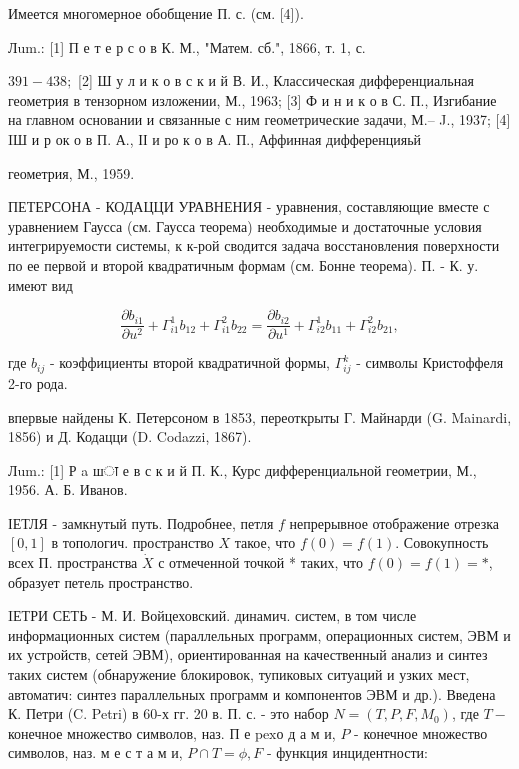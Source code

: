 \documentclass[10pt]{article}
\begin{document}
Имеется многомерное обобщение П. с. (см. [4]).



Лum.: [1] П е т е р с о в К. М., "Матем. сб.", 1866, т. 1, с.

$391-438 ;$ [2] Ш у л и к о в с к и й В. И., Классическая дифференциальная геометрия в тензорном изложении, М., 1963; [3] Ф и н и к о в С. П., Изгибание на главном основании и связанные с ним геометрические задачи, М.-- J., 1937; [4] IШ и р ок о в П. А., ІІ и ро к о в А. П., Аффинная дифференцияьй

геометрия, М., 1959.



ПЕТЕРСОНА - КОДАЦЦИ УРАВНЕНИЯ - уравнения, составляющие вместе с уравнением Гаусса (см. Гаусса теорема) необходимые и достаточные условия интегрируемости системы, к к-рой сводится задача восстановления поверхности по ее первой и второй квадратичным формам (см. Бонне теорема). П. - К. у. имеют вид



\[

\frac{\partial b_{i 1}}{\partial u^{2}}+\Gamma_{i 1}^{1} b_{12}+\Gamma_{i 1}^{2} b_{22}=\frac{\partial b_{i 2}}{\partial u^{1}}+\Gamma_{i 2}^{1} b_{11}+\Gamma_{i 2}^{2} b_{21},

\]



где $b_{i j}$ - коэффициенты второй квадратичной формы, $\Gamma_{i j}^{k}$ - символы Кристоффеля 2-го рода.



впервые найдены К. Петерсоном в 1853, переоткрыты Г. Майнарди (G. Mainardi, 1856) и Д. Кодацци (D. Codazzi, 1867).



Лum.: [1] Р a шा е в с к и й П. К., Курс дифференциальной геометрии, М., 1956. А. Б. Иванов.



ІЕТЛЯ - замкнутый путь. Подробнее, петля $f$ непрерывное отображение отрезка $[0,1]$ в топологич. пространство $X$ такое, что $f(0)=f(1)$. Совокупность всех П. пространства $\dot{X}$ с отмеченной точкой * таких, что $f(0)=f(1)=*$, образует петель пространство.



IЕТРИ СЕТЬ - М. И. Войцеховский. динамич. систем, в том числе информационных систем (параллельных программ, операционных систем, ЭВМ и их устройств, сетей ЭВМ), ориентированная на качественный анализ и синтез таких систем (обнаружение блокировок, тупиковых ситуаций и узких мест, автоматич: синтез параллельных программ и компонентов ЭВМ и др.). Введена К. Петри (C. Petri) в 60-х гг. 20 в. П. с. - это набор $N=\left(T, P, F, M_{0}\right)$, где $T-$ конечное множество символов, наз. П е $\mathrm{p} \mathrm{e} \mathrm{x} о$ д а м и, $P$ - конечное множество символов, наз. м е с т а м и, $P \cap T=\phi, F$ - функция инцидентности:
\end{document}
